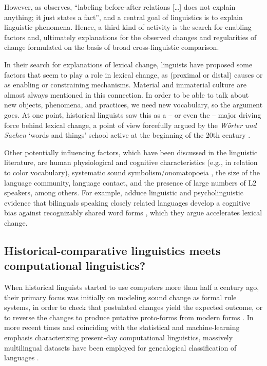 \documentclass[output=paper]{langsci/langscibook}
\begin{document}
However, as \citet[148]{anttila-1972} observes, ``labeling
before-after relations [\ldots] does not explain anything; it just
states a fact'', and a central goal of linguistics is to explain
linguistic phenomena. Hence, a third kind of activity is the
search for enabling factors and, ultimately explanations for the
observed changes and regularities of change formulated on the basis of
broad cross-linguistic comparison.

In their search for explanations of lexical change, linguists have
proposed some factors that seem to play a role in lexical change,
as (proximal or distal) causes or as enabling or constraining
mechanisms. Material and immaterial culture are almost always
mentioned in this connection. In order to be able to talk about new
objects, phenomena, and practices, we need new vocabulary, so the argument goes. At one point, historical linguists saw this as a -- or even the -- major
driving force behind lexical change, a point of view forcefully
argued by the \emph{Wörter und Sachen} `words and things'
school active at the beginning of the 20th century
\citep{meringer-1912}.

Other potentially influencing factors, which have been discussed in
the linguistic literature, are human physiological and cognitive
characteristics (e.g., in relation to color vocabulary), systematic
sound symbolism/onomatopoeia \citep{erben-johansson-etal-2020}, the
size of the language community, language contact, and the presence of
large numbers of L2 speakers, among others. For example,
\citet{ellison-miceli-2017} adduce linguistic and psycholinguistic
evidence that bilinguals speaking closely related languages develop a
cognitive bias against recognizably shared word forms \citep[termed
  ``doppels'' by][]{ellison-miceli-2017}, which they argue accelerates
lexical change.


\subsection{Historical-comparative linguistics meets computational linguistics?}\largerpage

When historical linguists started to use computers more than half a
century ago, their primary focus was initially on modeling sound
change as formal rule systems, in order to check that postulated
changes yield the expected outcome, or to reverse the changes to
produce putative proto-forms from modern forms
\citep[e.g.,][]{hewson-1973,hewson-1974,johnson-1985,borin-1988,lowe-mazaudon-1994}. In
more recent times and coinciding with the statistical and
machine-learning emphasis characterizing present-day computational
linguistics, massively multilingual datasets have been employed for
genealogical classification of languages \citep{brown-etal-2008}.
\end{document}
